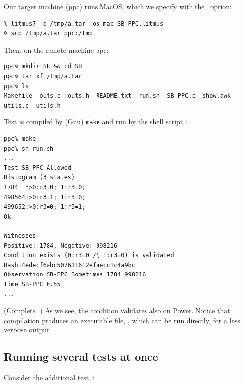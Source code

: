 Our target machine (ppc) runs MacOS, which we specify with the ~option:
\begin{verbatim}
% litmus7 -o /tmp/a.tar -os mac SB-PPC.litmus
% scp /tmp/a.tar ppc:/tmp
\end{verbatim}
Then, on the remote machine ppc:
\begin{verbatim}
ppc% mkdir SB && cd SB
ppc% tar xf /tmp/a.tar
ppc% ls
Makefile  outs.c  outs.h  README.txt  run.sh  SB-PPC.c  show.awk  utils.c  utils.h
\end{verbatim}
Test is compiled by (Gnu) \texttt{make} and run by the shell script
:
\begin{verbatim}
ppc% make
ppc% sh run.sh
...
Test SB-PPC Allowed
Histogram (3 states)
1784  *>0:r3=0; 1:r3=0;
498564:>0:r3=1; 1:r3=0;
499652:>0:r3=0; 1:r3=1;
Ok

Witnesses
Positive: 1784, Negative: 998216
Condition exists (0:r3=0 /\ 1:r3=0) is validated
Hash=4edecf6abc507611612efaecc1c4a9bc
Observation SB-PPC Sometimes 1784 998216
Time SB-PPC 0.55
...
\end{verbatim}
\ifhevea(Complete .) \fi
As we see, the condition validates also on Power.
Notice that compilation produces an executable file, ,
which can be run directly, for a less verbose output.


\subsection{Running several tests at once}

\label{stfw}Consider the additional test~:


